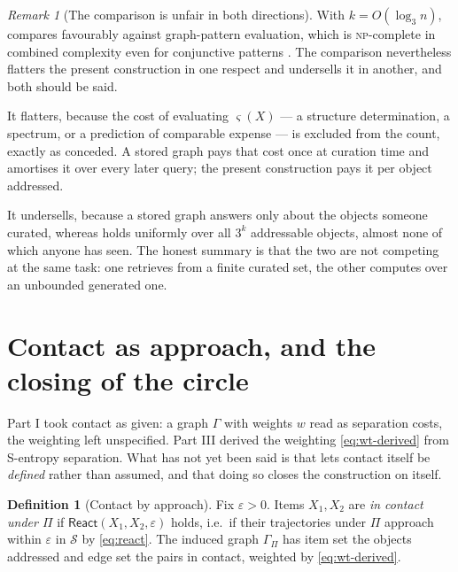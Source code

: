 \documentclass[11pt,twocolumn,a4paper]{article}
\theoremstyle{thmstyle}
\theoremstyle{definition}
\newtheorem{definition}[theorem]{Definition}
\theoremstyle{remark}
\newtheorem{remark}[theorem]{Remark}
\newcommand{\Gph}{\Gamma}
\newcommand{\wt}{w}
\newcommand{\Proc}{\Pi}
\newcommand{\Sspace}{\mathcal{S}}
\newcommand{\sse}{\varsigma}
\newcommand{\eps}{\varepsilon}
\begin{document}
\begin{remark}[The comparison is unfair in both directions]
\label{rem:query-cost-honest}
With $k = O(\log_3 n)$,  compares favourably
against graph-pattern evaluation, which is \textsc{np}-complete in
combined complexity even for conjunctive patterns \citep{perez2009}.
The comparison nevertheless flatters the present construction in one
respect and undersells it in another, and both should be said.

It flatters, because the cost of evaluating $\sse(X)$ --- a structure
determination, a spectrum, or a prediction of comparable expense
\citep{jumper2021,varadi2022} --- is excluded from the count, exactly
as  conceded. A stored graph pays that cost once
at curation time and amortises it over every later query; the present
construction pays it per object addressed.

It undersells, because a stored graph answers only about the objects
someone curated, whereas  holds uniformly over all
$3^k$ addressable objects, almost none of which anyone has seen. The
honest summary is that the two are not competing at the same task: one
retrieves from a finite curated set, the other computes over an
unbounded generated one.
\end{remark}

\section{Contact as approach, and the closing of the circle}
\label{sec:react-contact}

Part I took contact as given: a graph $\Gph$ with weights $\wt$ read as
separation costs, the weighting left unspecified. Part III derived the
weighting \eqref{eq:wt-derived} from S-entropy separation. What has not
yet been said is that  lets contact itself be
\emph{defined} rather than assumed, and that doing so closes the
construction on itself.

\begin{definition}[Contact by approach]
\label{def:contact-approach}
Fix $\eps > 0$. Items $X_1, X_2$ are \emph{in contact under $\Proc$} if
$\textsf{React}(X_1,X_2,\eps)$ holds, i.e.\ if their trajectories
under $\Proc$ approach within $\eps$ in $\Sspace$ by
\eqref{eq:react}. The induced graph $\Gph_\Proc$ has item set the
objects addressed and edge set the pairs in contact, weighted by
\eqref{eq:wt-derived}.
\end{definition}
\end{document}
